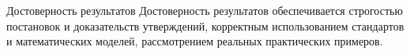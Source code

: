\documentclass{.local/lib/classes/ndvr-super-article-standalone}
\begin{document}
    \begin{description-item}{Достоверность результатов}
        Достоверность результатов 
        обеспечивается строгостью постановок 
        и доказательств утверждений, 
        корректным использованием стандартов 
        и математических моделей, 
        рассмотрением реальных практических примеров.
    \end{description-item}
\end{document}
